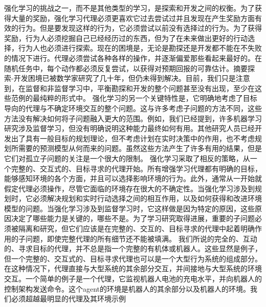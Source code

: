强化学习的挑战之一，而不是其他类型的学习，是探索和开发之间的权衡。为了获得大量的奖励，强化学习代理必须更喜欢它过去尝试过并且发现在产生奖励方面有效的行为。但是要发现这样的行为，它必须尝试以前没有选择过的行为。为了获得奖励，行为人必须挖掘自己已经经历过的东西，但为了在未来做出更好的行动选择，行为人也必须进行探索。现在的困境是，无论是勘探还是开发都不能在不失败的情况下进行。代理必须尝试各种各样的操作，并逐渐偏爱那些看起来最好的。在随机任务中，每个动作都必须反复尝试，以获得对预期回报的可靠估计。摘要探索-开发困境已被数学家研究了几十年，但仍未得到解决。目前，我们只是注意到，在监督和非监督学习中，平衡勘探和开发的整个问题甚至没有出现，至少在这些范例的最纯粹的形式中。
强化学习的另一个关键特性是，它明确地考虑了目标导向的代理与不确定环境交互的整个问题。这与许多考虑子问题的方法不同，这些方法没有解决如何将子问题融入更大的范围。例如，我们已经提到，许多机器学习研究涉及监督学习，但没有明确说明这种能力最终如何有用。其他研究人员已经开发出了具有一般目标的规划理论，但不考虑计划在实时决策中的作用，也不考虑规划所需要的预测模型从何而来的问题。虽然这些方法产生了许多有用的结果，但是它们对孤立子问题的关注是一个很大的限制。
强化学习采取了相反的策略，从一个完整的、交互式的、目标寻求的代理开始。所有增强学习代理都有明确的目标，能够感知环境的各个方面，并且可以选择影响环境的行为。此外，通常从一开始就假定代理必须操作，尽管它面临的环境存在很大的不确定性。当强化学习涉及到规划时，它必须解决规划和实时行动选择之间的相互作用，以及如何获得和改进环境模型的问题。当强化学习涉及到监督学习时，它这样做是因为特定的原因，这些原因决定了哪些能力是关键的，哪些不是。为了学习研究取得进展，重要的子问题必须被隔离和研究，但它们应该是在完整的、交互的、目标寻求的代理中起着明确作用的子问题，即使完整代理的所有细节还不能被填满。
我们所说的完全的、互动的、寻求目标的代理，并不总是指一个完整的有机体或机器人。这些显然是例子，但一个完整的、交互式的、目标寻求代理也可以是一个大型行为系统的组成部分。在这种情况下，代理直接与大型系统的其余部分交互，并间接地与大型系统的环境交互。一个简单的例子是一个代理，它监视机器人电池的充电水平，并向机器人的控制架构发送命令。这个agent的环境是机器人的其余部分以及机器人的环境。我们必须超越最明显的代理及其环境示例

